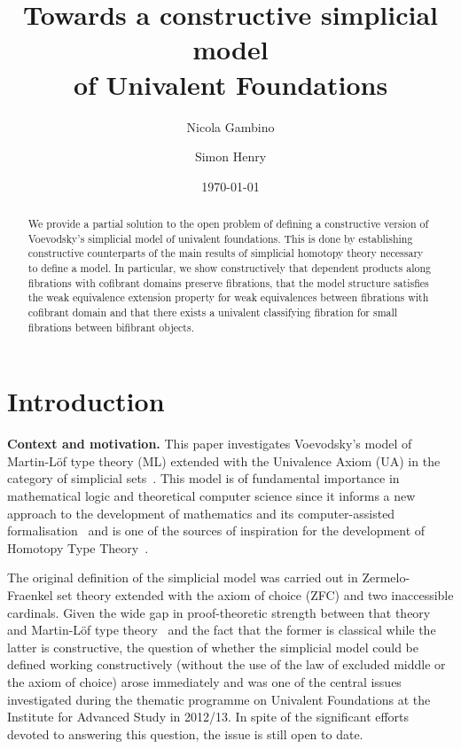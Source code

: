 \documentclass[reqno,10pt,a4paper,oneside,draft]{amsart}
\title[]{Towards a constructive  simplicial model \\ of Univalent Foundations}
\begin{document}
\begin{abstract}
We provide a partial solution to the open problem of defining a constructive version of 
Voevodsky's simplicial model of univalent foundations. This is done by establishing
constructive counterparts of the main results of simplicial homotopy theory
necessary to define a model. In particular, 
 we show constructively that dependent products along fibrations with
 cofibrant domains preserve fibrations, that the model structure satisfies the weak equivalence extension property
for weak equivalences between fibrations with cofibrant domain and that there exists a univalent 
classifying fibration for small fibrations between bifibrant objects.
\end{abstract}

\author{Nicola Gambino}
\address{School of Mathematics, University of Leeds, Leeds LS2 9JT, United Kingdom}


\author{Simon Henry}
\address{Department of Mathematics and Statistics, Masaryk University, Brno, Czeck Republic}


 \date{\today}
 
 

\maketitle



\section*{Introduction} 

\textbf{Context and motivation.} This paper investigates Voevodsky's model of Martin-L\"of type theory (ML)
extended with the Univalence Axiom (UA)  in the category of simplicial sets~\cite{voevodsky-simplicial-model}.  This model is of fundamental importance in mathematical logic and theoretical computer science since it  informs a new approach to the development of mathematics and its computer-assisted formalisation~\cite{voevodsky:library} and is one of
the sources of inspiration for the development of Homotopy Type Theory~\cite{hottbook}.

The original definition of the simplicial model  was carried out in  Zermelo-Fraenkel set theory extended with the axiom of choice (ZFC) and two inaccessible cardinals. Given the wide gap in proof-theoretic strength between that theory and Martin-L\"of type theory~\cite{GrifforE:strsml} and the fact that the former is classical  while the latter is constructive,  the question of whether the simplicial model could be defined working constructively (\ie without the use of the law of excluded middle or the axiom of choice) arose immediately and was one of the central issues investigated during the thematic programme on Univalent Foundations at the Institute for Advanced Study in 2012/13. In spite of the significant efforts devoted to answering this question, the issue is still open to date.
\end{document}
